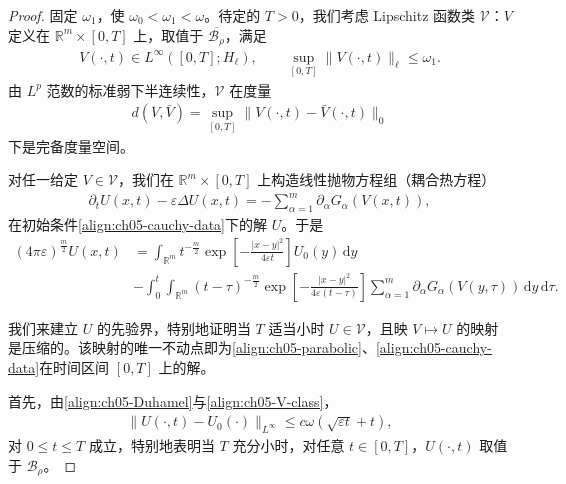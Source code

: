 \documentclass[../../main.tex]{subfiles}
\begin{document}
\begin{proof}
固定 $\omega_{1}$，使 $\omega_{0}<\omega_{1}<\omega$。待定的 $T>0$，我们考虑 Lipschitz 函数类 $\mathscr{V}$：$V$ 定义在 $\mathbb{R}^{m}\times[0,T]$ 上，取值于 $\overline{\mathscr{B}_{\rho}}$，满足
\begin{align}
V(\cdot,t)\in L^{\infty}([0,T];H_{\ell}),\qquad\sup_{[0,T]}\|V(\cdot,t)\|_{\ell}\leqslant\omega_{1}.\label{align:ch05-V-class}
\end{align}
由 $L^{p}$ 范数的标准弱下半连续性，$\mathscr{V}$ 在度量
\begin{align}
d(V,\bar{V})=\sup_{[0,T]}\|V(\cdot,t)-\bar{V}(\cdot,t)\|_{0}\label{align:ch05-V-metric}
\end{align}
下是完备度量空间。

对任一给定 $V\in\mathscr{V}$，我们在 $\mathbb{R}^{m}\times[0,T]$ 上构造线性抛物方程组（耦合热方程）
\begin{align}
\partial_{t}U(x,t)-\varepsilon\Delta U(x,t)=-\sum_{\alpha=1}^{m}\partial_{\alpha}G_{\alpha}(V(x,t)),\label{align:ch05-linear-parabolic}
\end{align}
在初始条件\eqref{align:ch05-cauchy-data}下的解 $U$。于是
\begin{align}
(4\pi\varepsilon)^{\frac{m}{2}}U(x,t)&=\int_{\mathbb{R}^{m}}t^{-\frac{m}{2}}\exp\left[-\frac{|x-y|^{2}}{4\varepsilon t}\right]U_{0}(y)\,\mathrm{d}y\nonumber\\
&-\int_{0}^{t}\int_{\mathbb{R}^{m}}(t-\tau)^{-\frac{m}{2}}\exp\left[-\frac{|x-y|^{2}}{4\varepsilon(t-\tau)}\right]\sum_{\alpha=1}^{m}\partial_{\alpha}G_{\alpha}(V(y,\tau))\,\mathrm{d}y\,\mathrm{d}\tau.\label{align:ch05-Duhamel}
\end{align}

我们来建立 $U$ 的先验界，特别地证明当 $T$ 适当小时 $U\in\mathscr{V}$，且映 $V\mapsto U$ 的映射是压缩的。该映射的唯一不动点即为\eqref{align:ch05-parabolic}、\eqref{align:ch05-cauchy-data}在时间区间 $[0,T]$ 上的解。

首先，由\eqref{align:ch05-Duhamel}与\eqref{align:ch05-V-class}，
\begin{align}
\|U(\cdot,t)-U_{0}(\cdot)\|_{L^{\infty}}\leqslant c\omega(\sqrt{\varepsilon t}+t),\label{align:ch05-Linf-bound}
\end{align}
对 $0\leqslant t\leqslant T$ 成立，特别地表明当 $T$ 充分小时，对任意 $t\in[0,T]$，$U(\cdot,t)$ 取值于 $\mathscr{B}_{\rho}$。


\end{proof}
\end{document}
